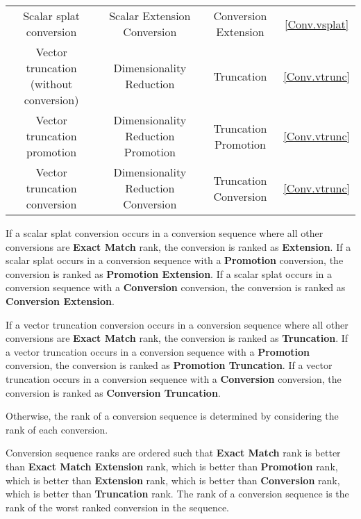 \begin{center}
\begin{tabular}{|| c | c | c | c ||}
    Scalar splat conversion & Scalar Extension Conversion & Conversion Extension
          & \ref{Conv.vsplat} \\ \cline{1-4}

    Vector truncation (without conversion) & Dimensionality Reduction
          & Truncation & \ref{Conv.vtrunc} \\ \cline{1-4}

    Vector truncation promotion & Dimensionality Reduction Promotion
          & Truncation Promotion  & \ref{Conv.vtrunc} \\ \cline{1-4}

    Vector truncation conversion & Dimensionality Reduction Conversion
          & Truncation Conversion & \ref{Conv.vtrunc} \\ \cline{1-4}
    \hline
  \end{tabular}
\end{center}

\p If a scalar splat conversion occurs in a conversion sequence where all other
conversions are \textbf{Exact Match} rank, the conversion is ranked as
\textbf{Extension}. If a scalar splat occurs in a conversion
sequence with a \textbf{Promotion} conversion, the conversion is ranked as
\textbf{Promotion Extension}. If a scalar splat occurs in a conversion
sequence with a \textbf{Conversion} conversion, the conversion is ranked as
\textbf{Conversion Extension}.

\p If a vector truncation conversion occurs in a conversion sequence where all
other conversions are \textbf{Exact Match} rank, the conversion is ranked as
\textbf{Truncation}. If a vector truncation occurs in a conversion
sequence with a \textbf{Promotion} conversion, the conversion is ranked as
\textbf{Promotion Truncation}. If a vector truncation occurs in a conversion
sequence with a \textbf{Conversion} conversion, the conversion is ranked as
\textbf{Conversion Truncation}.

\p Otherwise, the rank of a conversion sequence is determined by considering the
rank of each conversion.

\p Conversion sequence ranks are ordered such that \textbf{Exact
Match} rank is better than \textbf{Exact Match Extension} rank, which is better
than \textbf{Promotion} rank, which is better than \textbf{Extension} rank,
which is better than \textbf{Conversion} rank, which is better than
\textbf{Truncation} rank. The rank of a conversion sequence is the rank of the
worst ranked conversion in the sequence.

